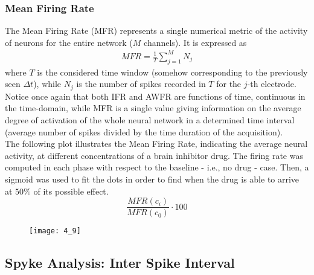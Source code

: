 \subsubsection{Mean Firing Rate}
The Mean Firing Rate (MFR) represents a single numerical metric of the activity of neurons
for the entire network (\(M\) channels). It is expressed as
\begin{align*}
    MFR=\frac{1}{T}\sum_{j=1}^{M}N_j
\end{align*}
where \(T\) is the considered time window (somehow corresponding to the previously seen
\(\Delta{t}\)), while \(N_j\) is the number of spikes recorded in \(T\) for the \(j\)-th
electrode.\\
Notice once again that both IFR and AWFR are functions of time, continuous in the time-domain,
while MFR is a single value giving information on the average degree of activation of the
whole neural network in a determined time interval (average number of spikes divided by the
time duration of the acquisition).\\
The following plot illustrates the Mean Firing Rate, indicating the average neural activity, at
different concentrations of a brain inhibitor drug. The firing rate was computed in each phase
with respect to the baseline - i.e., no drug - case. Then, a sigmoid was used to fit the dots
in order to find when the drug is able to arrive at \(50\%\) of its possible effect.
\begin{equation*}
    \frac{MFR(c_i)}{MFR(c_0)}\cdot100
\end{equation*}
\begin{figure}[H]
    \texttt{[image: 4\_9]}
    \centering
\end{figure}

\subsection{Spyke Analysis: Inter Spike Interval}
